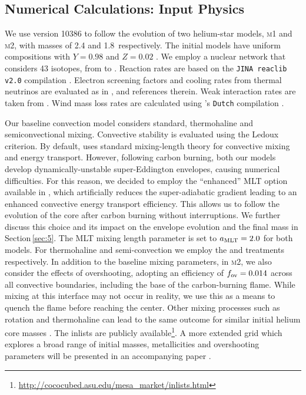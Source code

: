 \documentclass[../../main/thesis_msc.tex]{subfiles}
\begin{document}
\subsection{Numerical Calculations: Input Physics}\label{sec:2.1}
We use \mesa version 10386 to follow the evolution of two helium-star models, \textsc{m1} and \textsc{m2}, with  masses of  2.4 and 1.8\msun\ respectively. 
The initial models have uniform compositions with $Y=0.98$ and $Z=0.02$ \citep[solar abundances are taken from ][]{grevesse1998}. We employ a nuclear network that considers 43  isotopes, from  to . Reaction rates are based on the \texttt{JINA reaclib v2.0} compilation \citep{cyburt2010}. Electron screening factors and cooling rates from thermal neutrinos are evaluated as in \cite{Farmer:2015afs}, and references therein. 
Weak interaction rates are taken from \cite{Suzuki:2015iry}. 
Wind mass loss rates are calculated using \mesa's \texttt{Dutch} compilation   \citep{Paxton:2013pj}. 

Our baseline convection model considers standard, thermohaline and semiconvectional mixing. Convective stability is 
evaluated using the Ledoux criterion. By default, \mesa uses  standard mixing-length theory  \citep[MTL;][]{cox1968} for convective mixing and energy transport. However, following carbon burning, both our models develop 
dynamically-unstable super-Eddington envelopes, causing numerical 
difficulties. For this reason, we decided to employ the ``enhanced'' MLT 
option available in \mesa \citep{Paxton:2013pj}, which artificially reduces 
the super-adiabatic gradient leading to  an enhanced convective energy 
transport efficiency.  This  allows us to follow the evolution of the core 
after carbon burning without interruptions. We further discuss this choice and its impact on the envelope evolution and the final mass in Section\,\ref{sec:5}. 
The MLT mixing length parameter is set to $a_{\rm MLT}=2.0$ for both models. For thermohaline and semi-convection we employ the \cite{kippenhahn1980} and \cite{langer1983} treatments respectively. 
In addition to the baseline mixing parameters, in \textsc{m2}, we also 
consider the effects of overshooting, adopting an efficiency of $f_{\rm ov}=0.014$ across all convective boundaries, including the base of the 
carbon-burning flame. While mixing at this interface may not occur in reality, 
we use this as a means to  quench the flame before reaching the center.  
Other mixing processes such as rotation and thermohaline can lead to the 
same outcome for similar initial helium core masses \citep{Farmer:2015afs}.
The \mesa inlists are publicly available\footnote{\url{http://cococubed.asu.edu/mesa_market/inlists.html}}. 
A more extended grid which explores a broad range of initial masses, 
metallicities and overshooting parameters will be presented in an 
accompanying paper \citep{chanlaridis2019}.       
\end{document}
